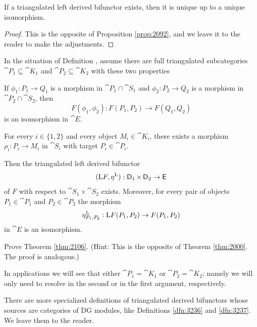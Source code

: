 \begin{prop} \label{prop:2105}
If a triangulated left derived bifunctor exists, then it is unique up to a 
unique isomorphism. 
\end{prop}

\begin{proof}
This is the opposite of Proposition \ref{prop:2092}, and we leave it to the 
reader to make the adjustments.
\end{proof}

\begin{thm} \label{thm:2106}
In the situation of Definition \tup{\ref{dfn:2105}}, 
assume there are full triangulated subcategories 
$\cat{P}_1 \subseteq \cat{K}_1$ and 
$\cat{P}_2 \subseteq \cat{K}_2$
with these two properties\tup{:}
\begin{enumerate}
 If $\phi_1 : P_1 \to Q_1$ is a
morphism in $\cat{P}_1 \cap \cat{S}_1$
and $\phi_2 : P_2 \to Q_2$ is a 
morphism in $\cat{P}_2 \cap \cat{S}_2$, then 
\[ F(\phi_1, \phi_2) : F(P_1, P_2) \to F(Q_1, Q_2) \]
is an isomorphism in $\cat{E}$.
 
For every $i \in \{1, 2\}$ and every object $M_i \in \cat{K}_i$,
there exists a morphism $\rho_i : P_i \to M_i$ in $\cat{S}_i$ with target 
$P_i \in \cat{P}_i$. 
\end{enumerate}
Then the triangulated left derived bifunctor%
\[ (\mathrm{L} F, \eta^{\mathrm{L}}) : \operatorname{\mathsf{D}}_1 \times \operatorname{\mathsf{D}}_2 \to \operatorname{\mathsf{E}} \]
of $F$ with respect to $\cat{S}_1 \times \cat{S}_2$
exists. Moreover, for every pair of objects $P_1 \in \cat{P}_1$ and 
$P_2 \in \cat{P}_2$ the morphism  
\[ \eta^{\mathrm{L}}_{P_1, P_2} :  \mathrm{L} F(P_1, P_2) \to F(P_1, P_2) \]
in $\cat{E}$ is an isomorphism.
\end{thm}

\begin{exer} \label{exer:4635}
Prove Theorem \ref{thm:2106}.
(Hint: This is the opposite of Theorem \ref{thm:2000}. The proof is analogous.)
\end{exer}


In applications we will see that either $\cat{P}_1 = \cat{K}_1$ or 
$\cat{P}_2 = \cat{K}_2$; namely we will only need to resolve in the second or 
in the first argument, respectively. 

There are more specialized definitions of triangulated derived bifunctors 
whose sources are categories of DG modules, like Definitions \ref{dfn:3236} and 
\ref{dfn:3237}. We leave them to the reader. 

